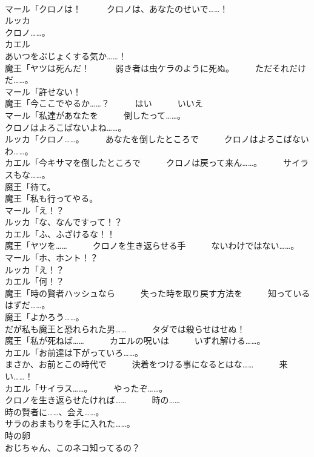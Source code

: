 \documentclass[8pt]{extreport}
\begin{document}
\begin{CJK}{UTF8}{min}
\\	マール「クロノは！　　　クロノは、あなたのせいで……！	
\\	ルッカ
\\	クロノ……。	
\\	カエル
\\	あいつをぶじょくする気か……！	
\\	魔王「ヤツは死んだ！　　　弱き者は虫ケラのように死ぬ。　　　ただそれだけだ……。	
\\	マール「許せない！	
\\	魔王「今ここでやるか……？　　　はい　　　いいえ	
\\	マール「私達があなたを　　　倒したって……。	
\\	クロノはよろこばないよね……。	
\\	ルッカ「クロノ……。　　　あなたを倒したところで　　　クロノはよろこばないわ……。	
\\	カエル「今キサマを倒したところで　　　クロノは戻って来ん……。　　　サイラスもな……。	
\\	魔王「待て。	
\\	魔王「私も行ってやる。	
\\	マール「え！？	
\\	ルッカ「な、なんですって！？	
\\	カエル「ふ、ふざけるな！！	
\\	魔王「ヤツを……　　　クロノを生き返らせる手　　　ないわけではない……。	
\\	マール「ホ、ホント！？	
\\	ルッカ「え！？	
\\	カエル「何！？	
\\	魔王「時の賢者ハッシュなら　　　失った時を取り戻す方法を　　　知っているはずだ……。	
\\	魔王「よかろう……。	
\\	だが私も魔王と恐れられた男……　　　タダでは殺らせはせぬ！	
\\	魔王「私が死ねば……　　　カエルの呪いは　　　いずれ解ける……。	
\\	カエル「お前達は下がっていろ……。	
\\	まさか、お前とこの時代で　　　決着をつける事になるとはな……　　　来い……！	
\\	カエル「サイラス……。　　　やったぞ……。	
\\	クロノを生き返らせたければ……　　　時の……	
\\	時の賢者に……、会え……。	
\\	サラのおまもりを手に入れた……。	
\\	時の卵	
\\	おじちゃん、このネコ知ってるの？	

\end{CJK}
\end{document}
